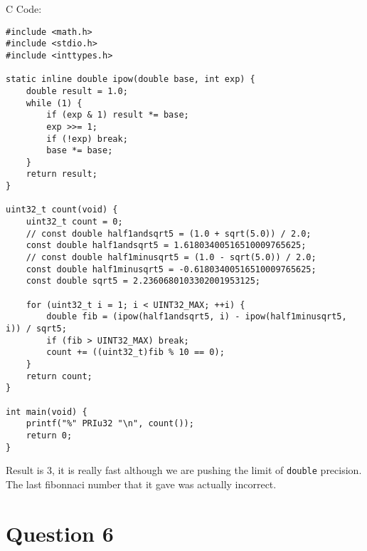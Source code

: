 \documentclass[12pt]{article}
\begin{document}
C Code:
\begin{verbatim}
#include <math.h>
#include <stdio.h>
#include <inttypes.h>

static inline double ipow(double base, int exp) {
    double result = 1.0;
    while (1) {
        if (exp & 1) result *= base;
        exp >>= 1;
        if (!exp) break;
        base *= base;
    }
    return result;
}

uint32_t count(void) {
    uint32_t count = 0;
    // const double half1andsqrt5 = (1.0 + sqrt(5.0)) / 2.0;
    const double half1andsqrt5 = 1.61803400516510009765625;
    // const double half1minusqrt5 = (1.0 - sqrt(5.0)) / 2.0;
    const double half1minusqrt5 = -0.61803400516510009765625;
    const double sqrt5 = 2.2360680103302001953125;

    for (uint32_t i = 1; i < UINT32_MAX; ++i) {
        double fib = (ipow(half1andsqrt5, i) - ipow(half1minusqrt5, i)) / sqrt5;
        if (fib > UINT32_MAX) break;
        count += ((uint32_t)fib % 10 == 0);
    }
    return count;
}

int main(void) {
    printf("%" PRIu32 "\n", count());
    return 0;
}
\end{verbatim}
Result is 3, it is really fast although we are pushing the limit of \texttt{double} precision. The last fibonnaci number that it gave was actually incorrect.

\clearpage
\section*{Question 6}
\end{document}
